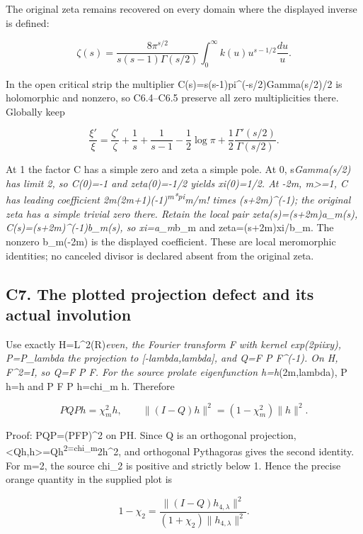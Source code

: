 \documentclass[
]{article}
\begin{document}
The original zeta remains recovered on every domain where the displayed
inverse is defined:

\[
\zeta(s)=\frac{8\pi^{s/2}}{s(s-1)\Gamma(s/2)}
\int_0^\infty k(u)u^{s-1/2}\frac{du}{u}.
\tag{C6.5}
\]

In the open critical strip the multiplier
C(s)=s(s-1)pi\^{}(-s/2)Gamma(s/2)/2 is holomorphic and nonzero, so
C6.4--C6.5 preserve all zero multiplicities there. Globally keep

\[
\frac{\xi'}{\xi}=
\frac{\zeta'}{\zeta}+\frac1s+\frac1{s-1}
-\frac12\log\pi+\frac12\frac{\Gamma'(s/2)}{\Gamma(s/2)}.
\tag{C6.6}
\]

At 1 the factor C has a simple zero and zeta a simple pole. At 0,
s\emph{Gamma(s/2) has limit 2, so C(0)=-1 and zeta(0)=-1/2 yields
xi(0)=1/2. At -2m, m\textgreater=1, C has leading coefficient
2m(2m+1)(-1)\textsuperscript{m*pi}m/m! times (s+2m)\^{}(-1); the
original zeta has a simple trivial zero there. Retain the local pair
zeta(s)=(s+2m)a\_m(s), C(s)=(s+2m)\^{}(-1)b\_m(s), so xi=a\_m}b\_m and
zeta=(s+2m)xi/b\_m. The nonzero b\_m(-2m) is the displayed coefficient.
These are local meromorphic identities; no canceled divisor is declared
absent from the original zeta.

\subsection{C7. The plotted projection defect and its actual
involution}\label{c7.-the-plotted-projection-defect-and-its-actual-involution}

Use exactly H=L\^{}2(R)\emph{even, the Fourier transform F with kernel
exp(2\emph{pi}i\emph{x}y), P=P\_lambda the projection to
{[}-lambda,lambda{]}, and Q=F P F\^{}(-1). On H, F\^{}2=I, so Q=F P F.
For the source prolate eigenfunction h=h}(2m,lambda), P h=h and P F P
h=chi\_m h. Therefore

\[
PQP h=\chi_m^2 h,\qquad
\|(I-Q)h\|^2=(1-\chi_m^2)\|h\|^2.
\tag{C7.1}
\]

Proof: PQP=(PFP)\^{}2 on PH. Since Q is an orthogonal projection,
\textless Qh,h\textgreater=\textbar\textbar Qh\textbar\textbar{}\textsuperscript{2=chi\_m}2\textbar\textbar h\textbar\textbar\^{}2,
and orthogonal Pythagoras gives the second identity. For m=2, the source
chi\_2 is positive and strictly below 1. Hence the precise orange
quantity in the supplied plot is

\[
1-\chi_2=
\frac{\|(I-Q)h_{4,\lambda}\|^2}
{(1+\chi_2)\|h_{4,\lambda}\|^2}.
\tag{C7.2}
\]
\end{document}
